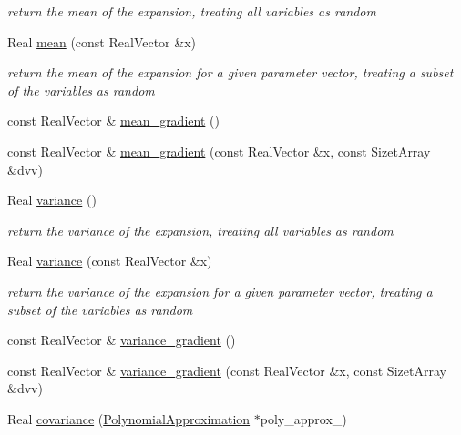 \begin{DoxyCompactItemize}
\begin{DoxyCompactList}\small\item\em return the mean of the expansion, treating all variables as random \end{DoxyCompactList}\item 
Real \hyperlink{classPecos_1_1HierarchInterpPolyApproximation_aed107df248a4555c052446fbc10a8e61}{mean} (const Real\+Vector \&x)\label{classPecos_1_1HierarchInterpPolyApproximation_aed107df248a4555c052446fbc10a8e61}

\begin{DoxyCompactList}\small\item\em return the mean of the expansion for a given parameter vector, treating a subset of the variables as random \end{DoxyCompactList}\item 
const Real\+Vector \& \hyperlink{classPecos_1_1HierarchInterpPolyApproximation_a069c87a26fdb4b09af68db26abd646a0}{mean\+\_\+gradient} ()
\item 
const Real\+Vector \& \hyperlink{classPecos_1_1HierarchInterpPolyApproximation_a24f2edc21c9887121cda78faae1c1475}{mean\+\_\+gradient} (const Real\+Vector \&x, const Sizet\+Array \&dvv)
\item 
Real \hyperlink{classPecos_1_1HierarchInterpPolyApproximation_a38f6da77468be17e02ce38af2c0976c3}{variance} ()\label{classPecos_1_1HierarchInterpPolyApproximation_a38f6da77468be17e02ce38af2c0976c3}

\begin{DoxyCompactList}\small\item\em return the variance of the expansion, treating all variables as random \end{DoxyCompactList}\item 
Real \hyperlink{classPecos_1_1HierarchInterpPolyApproximation_acbdcb523a161d7d3a5cc190796e84ede}{variance} (const Real\+Vector \&x)\label{classPecos_1_1HierarchInterpPolyApproximation_acbdcb523a161d7d3a5cc190796e84ede}

\begin{DoxyCompactList}\small\item\em return the variance of the expansion for a given parameter vector, treating a subset of the variables as random \end{DoxyCompactList}\item 
const Real\+Vector \& \hyperlink{classPecos_1_1HierarchInterpPolyApproximation_ae898fc2f42f1077268f89fc2e9f2c71c}{variance\+\_\+gradient} ()
\item 
const Real\+Vector \& \hyperlink{classPecos_1_1HierarchInterpPolyApproximation_a791e127a445f8a6c9c3a7966d12c1431}{variance\+\_\+gradient} (const Real\+Vector \&x, const Sizet\+Array \&dvv)
\item 
Real \hyperlink{classPecos_1_1HierarchInterpPolyApproximation_ac0085912d4abb9caa3f480b9c6778c0e}{covariance} (\hyperlink{classPecos_1_1PolynomialApproximation}{Polynomial\+Approximation} $\ast$poly\+\_\+approx\+\_)\label{classPecos_1_1HierarchInterpPolyApproximation_ac0085912d4abb9caa3f480b9c6778c0e}


\end{DoxyCompactItemize}
